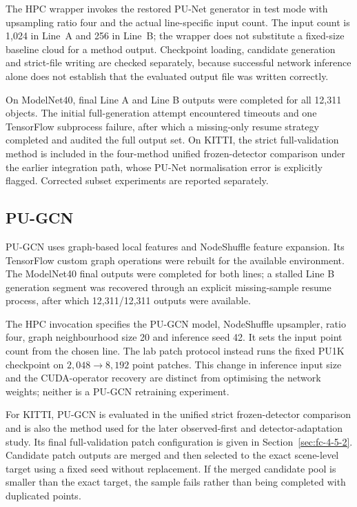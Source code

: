 The HPC wrapper invokes the restored PU-Net generator in test mode
with upsampling ratio four and the actual line-specific input count.
The input count is 1,024 in Line~A and 256 in Line~B; the wrapper does
not substitute a fixed-size baseline cloud for a method output.
Checkpoint loading, candidate generation and strict-file writing are
checked separately, because successful network inference alone does
not establish that the evaluated output file was written correctly.

On ModelNet40, final Line A and Line B outputs were completed for all 12,311 objects. The initial full-generation attempt encountered timeouts and one TensorFlow subprocess failure, after which a missing-only resume strategy completed and audited the full output set. On KITTI, the strict full-validation method is included in the four-method unified frozen-detector comparison under the earlier integration path, whose PU-Net normalisation error is explicitly flagged. Corrected subset experiments are reported separately.

\subsection{PU-GCN}
\label{sec:fc-4-5-5}

PU-GCN \cite{qian2021pugcn} uses graph-based local features and NodeShuffle feature expansion. Its TensorFlow custom graph operations were rebuilt for the available environment. The ModelNet40 final outputs were completed for both lines; a stalled Line B generation segment was recovered through an explicit missing-sample resume process, after which 12,311/12,311 outputs were available.

The HPC invocation specifies the PU-GCN model, NodeShuffle
upsampler, ratio four, graph neighbourhood size 20 and inference
seed 42. It sets the input point count from the chosen line. The lab
patch protocol instead runs the fixed PU1K checkpoint on
$2,048\rightarrow8,192$ point patches. This change in inference input
size and the CUDA-operator recovery are distinct from optimising the
network weights; neither is a PU-GCN retraining experiment.

For KITTI, PU-GCN is evaluated in the unified strict frozen-detector comparison and is also the method used for the later observed-first and detector-adaptation study. Its final full-validation patch configuration is given in Section~\ref{sec:fc-4-5-2}. Candidate patch outputs are merged and then selected to the exact scene-level target using a fixed seed without replacement. If the merged candidate pool is smaller than the exact target, the sample fails rather than being completed with duplicated points.

